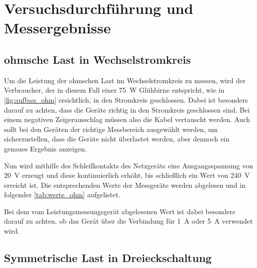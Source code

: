 \documentclass[12pt,english,ngerman]{scrartcl}
\begin{document}
\section{Versuchsdurchführung und Messergebnisse}\label{sec:versuchsdurchfuehrung_messergebnisse}

\subsection{ohmsche Last in Wechselstromkreis}

Um die Leistung der ohmschen Last im Wechselstromkreis zu messen, wird der
Verbraucher, der in diesem Fall einer \SI[]{75}{\watt} Glühbirne entspricht,
wie in \autoref{fig:aufbau_ohm} ersichtlich, in den Stromkreis geschlossen.
Dabei ist besonders darauf zu achten, dass die Geräte richtig in den Stromkreis
geschlossen sind. Bei einem negativen Zeigerausschlag müssen also die Kabel
vertauscht werden. Auch sollt bei den Geräten der richtige Messbereich
ausgewählt werden, um sicherzustellen, dass die Geräte nicht überlastet werden,
aber dennoch ein genaues Ergebnis anzeigen.

Nun wird mithilfe des Schleifkontakts des Netzgeräts eine Ausgangsspannung von
\SI[]{20}{\volt} erzeugt und diese kontinuierlich erhöht, bis schließlich ein
Wert von \SI[]{240}{\volt} erreicht ist.
Die entsprechenden Werte der Messgeräte werden abgelesen und in folgender
\autoref{tab:werte_ohm} aufgelistet.

Bei dem vom Leistungsmessungsgerät abgelesenen Wert ist dabei besonders darauf
zu achten, ob das Gerät über die Verbindung für \SI{1}{\ampere} oder
\SI{5}{\ampere} verwendet wird.

\begin{table}[H]
	\caption[Gemessene Werte bei der Variation der ohmschen Last]{Gemessene Werte bei der
		Variation der ohmschen Last       \\
		$U \dots$ gemessene Spannung in V \\
		$I \dots$ gemessener Strom in A   \\
		$P \dots$ gemessene Leistung in W
	}\label{tab:werte_ohm}
	\centering
	
\end{table}

\subsection{Symmetrische Last in Dreieckschaltung}
\end{document}
